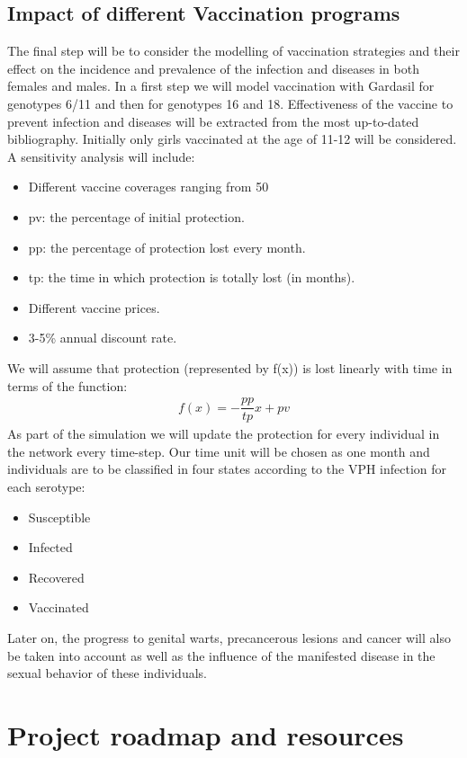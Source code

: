 \subsection{Impact of different Vaccination programs}

The final step will be to consider the modelling of vaccination strategies and their effect on the incidence and prevalence of the infection and diseases in both females and males. In a first step we will model vaccination with Gardasil for genotypes 6/11 and then for genotypes 16 and 18. Effectiveness of the vaccine to prevent infection and diseases will be extracted from the most up-to-dated bibliography. Initially only girls vaccinated at the age of 11-12 will be considered. A sensitivity analysis will include:
\begin{itemize}
	\item Different vaccine coverages ranging from 50%
	\item pv: the percentage of initial protection.
	\item pp: the percentage of protection lost every month.
	\item tp: the time in which protection is totally lost (in months).
	\item Different vaccine prices.
	\item 3-5\% annual discount rate.
\end{itemize}

We will assume that protection (represented by f(x)) is lost linearly with time in terms of the function: 
\begin{align*}
f(x)=-\dfrac{pp}{tp}x+pv
\end{align*}
As part of the simulation we will update the protection for every individual in the network every time-step. Our time unit will be chosen as one month and individuals are to be classified in four states according to the VPH infection for each serotype:
\begin{itemize}
	\item Susceptible
	\item Infected
	\item Recovered
	\item Vaccinated
\end{itemize}

Later on, the progress to genital warts, precancerous lesions and cancer will also be taken into account as well as the influence of the manifested disease in the sexual behavior of these individuals. 

\section{Project roadmap and resources}

